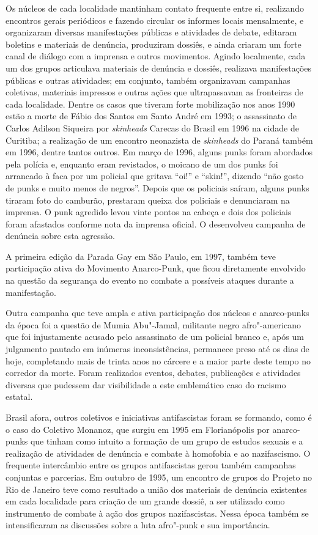 Os núcleos  de cada localidade mantinham contato frequente entre si, realizando encontros gerais periódicos e fazendo circular os informes locais mensalmente, e organizaram diversas manifestações públicas e atividades de debate, editaram boletins e materiais de denúncia, produziram dossiês, e ainda criaram um forte canal de diálogo com a imprensa e outros movimentos. Agindo localmente, cada um dos grupos articulava materiais de denúncia e dossiês, realizava manifestações públicas e outras atividades; em conjunto, também organizavam campanhas coletivas, materiais impressos e outras ações que ultrapassavam as fronteiras de cada localidade. Dentre os casos que tiveram forte mobilização nos anos 1990 estão a morte de Fábio dos Santos em Santo André em 1993; o assassinato de Carlos Adilson Siqueira por \emph{skinheads} Carecas do Brasil em 1996 na cidade de Curitiba; a realização de um encontro neonazista de \emph{skinheads} do Paraná também em 1996, dentre tantos outros. Em março de 1996, alguns punks foram abordados pela polícia e, enquanto eram revistados, o moicano de um dos punks foi arrancado à faca por um policial que gritava ``oi!'' e ``skin!'', dizendo ``não gosto de punks e muito menos de negros''. Depois que os policiais saíram, alguns punks tiraram foto do camburão, prestaram queixa dos policiais e denunciaram na imprensa. O punk agredido levou vinte pontos na cabeça e dois dos policiais foram afastados conforme nota da imprensa oficial. O  desenvolveu campanha de denúncia sobre esta agressão.

A primeira edição da Parada Gay em São Paulo, em 1997, também teve participação ativa do Movimento Anarco-Punk, que ficou diretamente envolvido na questão da segurança do evento no combate a possíveis ataques durante a manifestação.

Outra campanha que teve ampla e ativa participação dos núcleos  e anarco-punks da época foi a questão de Mumia Abu"-Jamal, militante negro afro"-americano que foi injustamente acusado pelo assassinato de um policial branco e, após um julgamento pautado em inúmeras inconsistências, permanece preso até os dias de hoje, completando mais de trinta anos no cárcere e a maior parte deste tempo no corredor da morte. Foram realizados eventos, debates, publicações e atividades diversas que pudessem dar visibilidade a este emblemático caso do racismo estatal.

Brasil afora, outros coletivos e iniciativas antifascistas foram se formando, como é o caso do Coletivo Monanoz, que surgiu em 1995 em Florianópolis por anarco-punks que tinham como intuito a formação de um grupo de estudos sexuais e a realização de atividades de denúncia e combate à homofobia e ao nazifascismo. O frequente intercâmbio entre os grupos antifascistas gerou também campanhas conjuntas e parcerias. Em outubro de 1995, um encontro de grupos do Projeto  no Rio de Janeiro teve como resultado a união dos materiais de denúncia existentes em cada localidade para criação de um grande dossiê, a ser utilizado como instrumento de combate à ação dos grupos nazifascistas. Nessa época também se intensificaram as discussões sobre a luta afro"-punk e sua importância.

